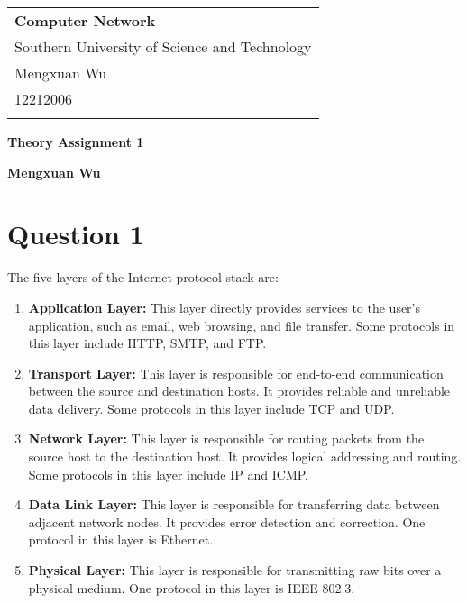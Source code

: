 \documentclass[a4paper,12pt]{article}
\begin{document}
\thispagestyle{empty} %

\begin{tabular}{p{15.5cm}}
{\large \bf Computer Network} \\
Southern University of Science and Technology \\ Mengxuan Wu \\ 12212006 \\
\hline
\\
\end{tabular}

\vspace*{0.3cm} %

\begin{center}
	{\Large \bf Theory Assignment 1}
	\vspace{2mm}

	{\bf Mengxuan Wu}
		
\end{center}  

\vspace{0.4cm}

\section*{Question 1}

The five layers of the Internet protocol stack are:
\begin{enumerate}
  \item \textbf{Application Layer:} This layer directly provides services to the user's application, such as email, web browsing, and file transfer. Some protocols in this layer include HTTP, SMTP, and FTP.
  \item \textbf{Transport Layer:} This layer is responsible for end-to-end communication between the source and destination hosts. It provides reliable and unreliable data delivery. Some protocols in this layer include TCP and UDP.
  \item \textbf{Network Layer:} This layer is responsible for routing packets from the source host to the destination host. It provides logical addressing and routing. Some protocols in this layer include IP and ICMP.
  \item \textbf{Data Link Layer:} This layer is responsible for transferring data between adjacent network nodes. It provides error detection and correction. One protocol in this layer is Ethernet.
  \item \textbf{Physical Layer:} This layer is responsible for transmitting raw bits over a physical medium. One protocol in this layer is IEEE 802.3.
\end{enumerate}
\end{document}

